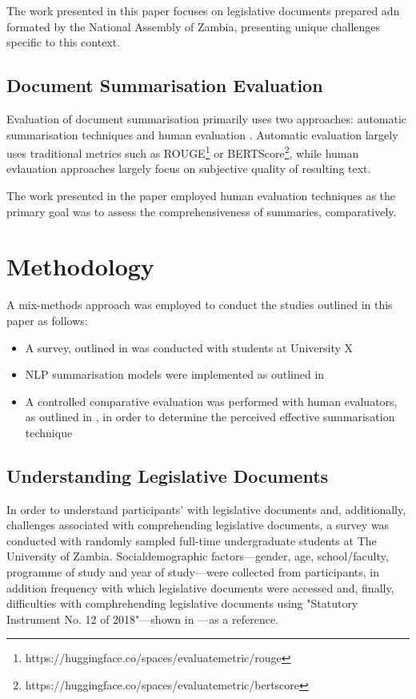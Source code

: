\documentclass[conference]{IEEEtran}
\begin{document}
The work presented in this paper focuses on legislative documents prepared adn formated by the National Assembly of Zambia, presenting unique challenges specific to this context.

\subsection{Document Summarisation Evaluation}
\label{sec:related_work:evaluation}
Evaluation of document summarisation primarily uses two approaches: automatic summarisation techniques and human evaluation \cite{Steinberger2009Evaluation}. Automatic evaluation largely uses traditional metrics such as ROUGE\footnote{https://huggingface.co/spaces/evaluate\-metric/rouge} or BERTScore\footnote{https://huggingface.co/spaces/evaluate\-metric/bertscore}, while human evlauation approaches largely focus on subjective quality of resulting text.

The work presented in the paper employed human evaluation techniques as the primary goal was to assess the comprehensiveness of summaries, comparatively.

\section{Methodology}
\label{sec:methodology}
A mix-methods approach was employed to conduct the studies outlined in this paper as follows:
\begin{itemize}
    \item A survey, outlined in  was conducted with students at University X
    \item NLP summarisation models were implemented as outlined in 
    \item A controlled comparative evaluation was performed with human evaluators, as outlined in , in order to determine the perceived effective summarisation technique
\end{itemize}

\subsection{Understanding Legislative Documents}
\label{sec:methodology:understanding_legislation_documents}
In order to understand participants' with legislative documents and, additionally, challenges associated with comprehending legislative documents, a survey was conducted with randomly sampled full-time undergraduate students at The University of Zambia. Socialdemographic factors---gender, age, school/faculty, programme of study and year of study---were collected from participants, in addition frequency with which legislative documents were accessed and, finally, difficulties with comphrehending legislative documents using "Statutory Instrument No. 12 of 2018"---shown in ---as a reference.
\end{document}
